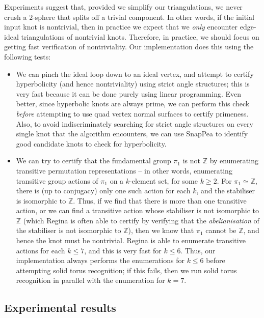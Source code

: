 \documentclass[a4paper,UKenglish,cleveref, autoref, thm-restate]{lipics-v2021}
\begin{document}
Experiments suggest that, provided we simplify our triangulations, we never crush a $2$-sphere that splits off a trivial component.
In other words, if the initial input knot is nontrivial, then in practice we expect that we \emph{only} encounter edge-ideal triangulations of nontrivial knots.
Therefore, in practice, we should focus on getting fast verification of nontriviality.
Our implementation does this using the following tests:
\begin{itemize}
\item
We can pinch the ideal loop down to an ideal vertex, and attempt to certify hyperbolicity (and hence nontriviality) using strict angle structures;
this is very fast because it can be done purely using linear programming.
Even better, since hyperbolic knots are always prime, we can perform this check \emph{before}
attempting to use quad vertex normal surfaces to certify primeness.
Also, to avoid indiscriminately searching for strict angle structures on every single knot that the algorithm encounters,
we can use SnapPea to identify good candidate knots to check for hyperbolicity.
\item
We can try to certify that the fundamental group $\pi_1$ is not $\mathbb{Z}$ by enumerating transitive permutation representations --
in other words, enumerating transitive group actions of $\pi_1$ on a $k$-element set, for some $k \geqslant 2$.
For $\pi_1 \simeq \mathbb{Z}$, there is (up to conjugacy) only one such action for each $k$, and the stabiliser is isomorphic to $\mathbb{Z}$.
Thus, if we find that there is more than one transitive action, or we can find a transitive action whose stabiliser is not isomorphic to $\mathbb{Z}$
(which Regina is often able to certify by verifying that the \emph{abelianisation} of the stabiliser is not isomorphic to $\mathbb{Z}$),
then we know that $\pi_1$ cannot be $\mathbb{Z}$, and hence the knot must be nontrivial.
Regina is able to enumerate transitive actions for each $k \leqslant 7$, and this is very fast for $k \leqslant 6$.
Thus, our implementation always performs the enumerations for $k \leqslant 6$ before attempting solid torus recognition;
if this fails, then we run solid torus recognition in parallel with the enumeration for $k = 7$.
\end{itemize}

\subsection{Experimental results}\label{ssec:experiment}
\end{document}
